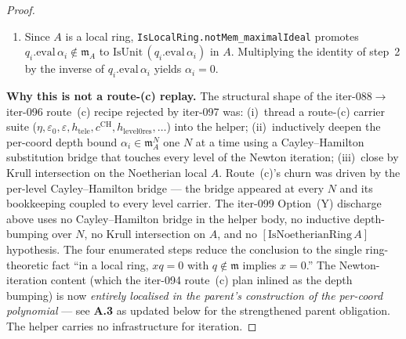 \begin{proof}
\begin{enumerate}
\[\;+\; \alpha_i \cdot q_i'.\mathrm{eval}\,\alpha_i.
\]
Reducing modulo $\mathfrak m_A$, the second summand vanishes
(since $\alpha_i \in \mathfrak m_A^{d+1} \subseteq \mathfrak m_A$),
hence $p_i'(\alpha_i) \equiv q_i.\mathrm{eval}\,\alpha_i \pmod
{\mathfrak m_A}$. By the carrier
$\mathrm{IsUnit}\,(p_i'(\alpha_i) \bmod \mathfrak m_A)$, the
same holds for $q_i.\mathrm{eval}\,\alpha_i$: it is a unit modulo
$\mathfrak m_A$, equivalently
$q_i.\mathrm{eval}\,\alpha_i \notin \mathfrak m_A$.
\item Since $A$ is a local ring,
\texttt{IsLocalRing.notMem\_maximalIdeal} promotes
$q_i.\mathrm{eval}\,\alpha_i \notin \mathfrak m_A$ to
$\mathrm{IsUnit}\,(q_i.\mathrm{eval}\,\alpha_i)$ in $A$.
Multiplying the identity of step~2 by the inverse of
$q_i.\mathrm{eval}\,\alpha_i$ yields $\alpha_i = 0$.
\end{enumerate}

\textbf{Why this is not a route-(c) replay.}
The structural shape of the iter-088$\to$iter-096 route~(c)
recipe rejected by iter-097 was: (i)~thread a route-(c) carrier
suite ($\eta, \varepsilon_0, \varepsilon, h_{\mathrm{tele}}, c^{\mathrm{CH}},
h_{\mathrm{level} 0\mathrm{res}}, \ldots$) into the helper;
(ii)~inductively deepen the per-coord depth bound $\alpha_i \in
\mathfrak m_A^N$ one $N$ at a time using a Cayley--Hamilton
substitution bridge that touches every level of the Newton
iteration; (iii)~close by Krull intersection on the Noetherian
local $A$. Route~(c)'s churn was driven by the per-level
Cayley--Hamilton bridge — the bridge appeared at every $N$ and
its bookkeeping coupled to every level carrier.
The iter-099 Option~(Y) discharge above uses no Cayley--Hamilton
bridge in the helper body, no inductive depth-bumping over $N$,
no Krull intersection on $A$, and no $[\mathrm{IsNoetherianRing}\,A]$
hypothesis. The four enumerated steps reduce the conclusion to
the single ring-theoretic fact ``in a local ring, $x q = 0$ with
$q \notin \mathfrak m$ implies $x = 0$.'' The Newton-iteration
content (which the iter-094 route~(c) plan inlined as the depth
bumping) is now \emph{entirely localised in the parent's
construction of the per-coord polynomial} — see
\textbf{A.3} as updated below for the strengthened parent
obligation. The helper carries no infrastructure for iteration.


\end{proof}
